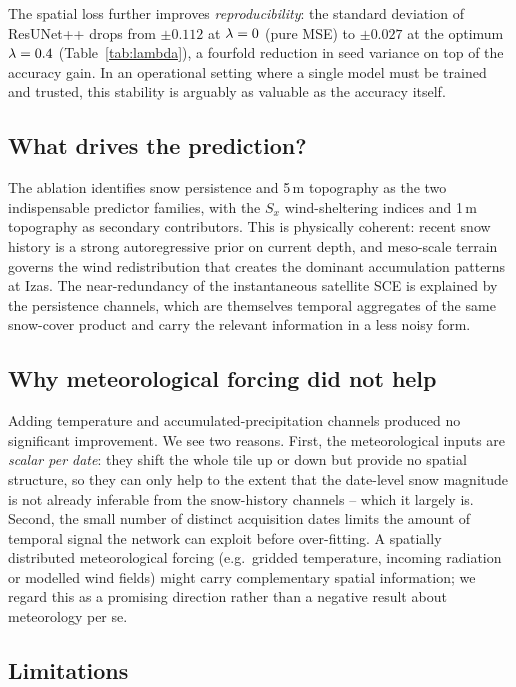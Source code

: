 The spatial loss further improves \emph{reproducibility}: the \Rsq{} standard
deviation of ResUNet++ drops from $\pm0.112$ at $\lambda=0$ (pure MSE) to
$\pm0.027$ at the optimum $\lambda=0.4$ (Table~\ref{tab:lambda}), a fourfold
reduction in seed variance on top of the accuracy gain. In an operational
setting where a single model must be trained and trusted, this stability is
arguably as valuable as the accuracy itself.

\subsection{What drives the prediction?}

The ablation identifies snow persistence and 5\,m topography as the two
indispensable predictor families, with the $S_x$ wind-sheltering indices and
1\,m topography as secondary contributors. This is physically coherent:
recent snow history is a strong autoregressive prior on current depth, and
meso-scale terrain governs the wind redistribution that creates the dominant
accumulation patterns at Izas. The near-redundancy of the instantaneous
satellite SCE is explained by the persistence channels, which are themselves
temporal aggregates of the same snow-cover product and carry the relevant
information in a less noisy form.

\subsection{Why meteorological forcing did not help}

Adding temperature and accumulated-precipitation channels produced no
significant improvement. We see two reasons. First, the meteorological inputs
are \emph{scalar per date}: they shift the whole tile up or down but provide no
spatial structure, so they can only help to the extent that the date-level
snow magnitude is not already inferable from the snow-history channels -- which
it largely is. Second, the small number of distinct acquisition dates limits
the amount of temporal signal the network can exploit before over-fitting. A
spatially distributed meteorological forcing (e.g.\ gridded temperature,
incoming radiation or modelled wind fields) might carry complementary spatial
information; we regard this as a promising direction rather than a negative
result about meteorology per se.

\subsection{Limitations}

